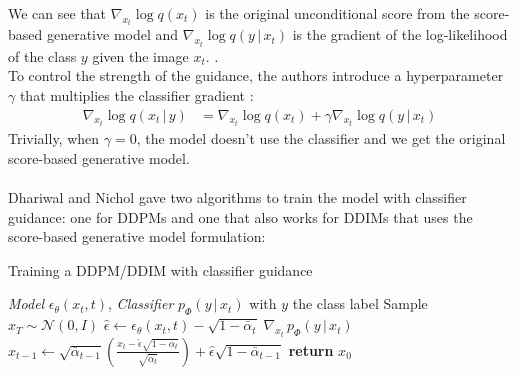 \documentclass[twoside]{article}
\numberwithin{equation}{section}
\numberwithin{figure}{section}
\begin{document}
We can see that $\nabla_{x_t} \log q(x_t)$ is the original unconditional score from the score-based generative model and $\nabla_{x_t} \log q(y \, | \, x_t)$ is the gradient of the log-likelihood of the class $y$ given the image $x_t$. \cite{dhariwal2021diffusion, luo2022understanding}. \\
To control the strength of the guidance, the authors introduce a hyperparameter $\gamma$ that multiplies the classifier gradient \cite{dhariwal2021diffusion,luo2022understanding}:
\begin{align}
  \nabla_{x_t} \log q(x_t \, | \, y) &= \nabla_{x_t} \log q(x_t) + \gamma \nabla_{x_t} \log q(y \, | \, x_t)
\end{align}
Trivially, when $\gamma = 0$, the model doesn't use the classifier and we get the original score-based generative model.
\\\\
Dhariwal and Nichol \cite{dhariwal2021diffusion} gave two algorithms to train the model with classifier guidance: one for DDPMs and one that also works for DDIMs that uses the score-based generative model formulation:
\begin{algorithm}[H]
  \centering
  \caption{Training a DDPM/DDIM with classifier guidance}\label{alg:ddpm_classifier}
  \begin{algorithmic}[1]
    \Require \textit{Model} $\epsilon_\theta (x_t, t)$, \textit{Classifier} $p_\Phi (y \, | \, x_t)$ with $y$ the class label
    \State Sample $x_T \sim \mathcal{N}(0, I)$
      \State $\hat{\epsilon} \leftarrow \epsilon_\theta (x_t, t) - \sqrt{1 - \bar{\alpha}_t} \; \nabla_{x_t} \, p_\Phi (y \, | \, x_t)$
      \State $x_{t-1} \leftarrow \sqrt{\bar{\alpha}_{t-1}} \left( \frac{x_t - \hat{\epsilon} \sqrt{1 - \bar{\alpha}_t}}{\sqrt{\bar{\alpha}_t}} \right) + \hat{\epsilon} \sqrt{1 - \bar{\alpha}_{t-1}}$
    \EndFor
    \State \textbf{return} $x_0$
  \end{algorithmic}
\end{algorithm}
\end{document}
